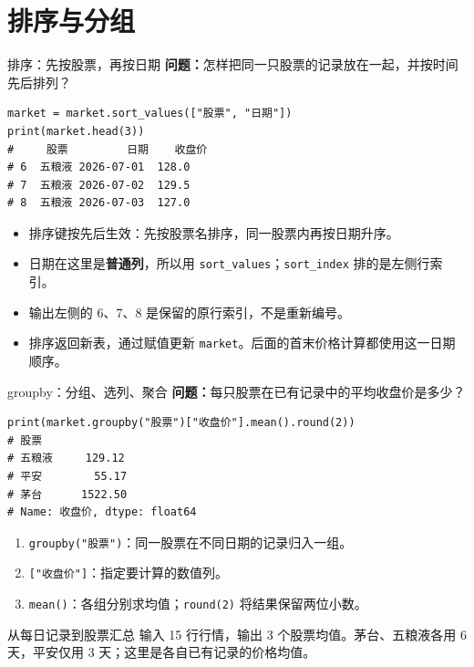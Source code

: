 \documentclass[9pt]{ctexbeamer}
\begin{document}
\section{排序与分组}
\begin{frame}[fragile]{排序：先按股票，再按日期}
\small \textbf{问题：}怎样把同一只股票的记录放在一起，并按时间先后排列？
\begin{lstlisting}
market = market.sort_values(["股票", "日期"])
print(market.head(3))
#     股票         日期    收盘价
# 6  五粮液 2026-07-01  128.0
# 7  五粮液 2026-07-02  129.5
# 8  五粮液 2026-07-03  127.0
\end{lstlisting}
\begin{itemize}
\item 排序键按先后生效：先按股票名排序，同一股票内再按日期升序。
\item 日期在这里是\textbf{普通列}，所以用 \texttt{sort\_values}；\texttt{sort\_index} 排的是左侧行索引。
\item 输出左侧的 6、7、8 是保留的原行索引，不是重新编号。
\item 排序返回新表，通过赋值更新 \texttt{market}。后面的首末价格计算都使用这一日期顺序。
\end{itemize}
\end{frame}

\begin{frame}[fragile]{groupby：分组、选列、聚合}
\small \textbf{问题：}每只股票在已有记录中的平均收盘价是多少？
\begin{lstlisting}
print(market.groupby("股票")["收盘价"].mean().round(2))
# 股票
# 五粮液     129.12
# 平安        55.17
# 茅台      1522.50
# Name: 收盘价, dtype: float64
\end{lstlisting}
\begin{enumerate}
\item \texttt{groupby("股票")}：同一股票在不同日期的记录归入一组。
\item \texttt{["收盘价"]}：指定要计算的数值列。
\item \texttt{mean()}：各组分别求均值；\texttt{round(2)} 将结果保留两位小数。
\end{enumerate}
\begin{block}{从每日记录到股票汇总}
输入 15 行行情，输出 3 个股票均值。茅台、五粮液各用 6 天，平安仅用 3 天；这里是各自已有记录的价格均值。
\end{block}
\end{frame}
\end{document}
